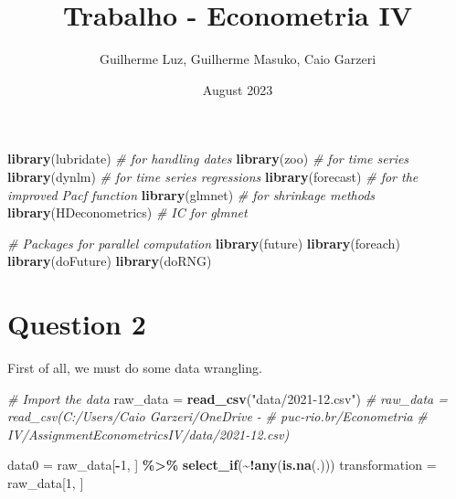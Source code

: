 \documentclass[
]{article}
\title{Trabalho - Econometria IV}
\author{Guilherme Luz, Guilherme Masuko, Caio Garzeri}
\date{August 2023}
\newenvironment{Shaded}{\begin{snugshade}}{\end{snugshade}}
\newcommand{\CommentTok}[1]{\textcolor[rgb]{0.56,0.35,0.01}{\textit{#1}}}
\newcommand{\DecValTok}[1]{\textcolor[rgb]{0.00,0.00,0.81}{#1}}
\newcommand{\FunctionTok}[1]{\textcolor[rgb]{0.13,0.29,0.53}{\textbf{#1}}}
\newcommand{\NormalTok}[1]{#1}
\newcommand{\OtherTok}[1]{\textcolor[rgb]{0.56,0.35,0.01}{#1}}
\newcommand{\SpecialCharTok}[1]{\textcolor[rgb]{0.81,0.36,0.00}{\textbf{#1}}}
\newcommand{\StringTok}[1]{\textcolor[rgb]{0.31,0.60,0.02}{#1}}
\begin{document}
\maketitle

\begin{Shaded}
\begin{Highlighting}[]
\FunctionTok{library}\NormalTok{(lubridate)  }\CommentTok{\# for handling dates}
\FunctionTok{library}\NormalTok{(zoo)  }\CommentTok{\# for time series}
\FunctionTok{library}\NormalTok{(dynlm)  }\CommentTok{\# for time series regressions}
\FunctionTok{library}\NormalTok{(forecast)  }\CommentTok{\# for the improved Pacf function}
\FunctionTok{library}\NormalTok{(glmnet)  }\CommentTok{\# for shrinkage methods}
\FunctionTok{library}\NormalTok{(HDeconometrics)  }\CommentTok{\# IC for glmnet}

\CommentTok{\# Packages for parallel computation}
\FunctionTok{library}\NormalTok{(future)}
\FunctionTok{library}\NormalTok{(foreach)}
\FunctionTok{library}\NormalTok{(doFuture)}
\FunctionTok{library}\NormalTok{(doRNG)}
\end{Highlighting}
\end{Shaded}

\hypertarget{question-2}{%
\section{Question 2}\label{question-2}}

First of all, we must do some data wrangling.

\begin{Shaded}
\begin{Highlighting}[]
\CommentTok{\# Import the data}
\NormalTok{raw\_data }\OtherTok{=} \FunctionTok{read\_csv}\NormalTok{(}\StringTok{"data/2021{-}12.csv"}\NormalTok{)}
\CommentTok{\# raw\_data = read\_csv(\textquotesingle{}C:/Users/Caio Garzeri/OneDrive {-}}
\CommentTok{\# puc{-}rio.br/Econometria}
\CommentTok{\# IV/AssignmentEconometricsIV/data/2021{-}12.csv\textquotesingle{})}

\NormalTok{data0 }\OtherTok{=}\NormalTok{ raw\_data[}\SpecialCharTok{{-}}\DecValTok{1}\NormalTok{, ] }\SpecialCharTok{\%\textgreater{}\%}
    \FunctionTok{select\_if}\NormalTok{(}\SpecialCharTok{\textasciitilde{}!}\FunctionTok{any}\NormalTok{(}\FunctionTok{is.na}\NormalTok{(.)))}
\NormalTok{transformation }\OtherTok{=}\NormalTok{ raw\_data[}\DecValTok{1}\NormalTok{, ]}
\end{Highlighting}
\end{Shaded}
\end{document}
